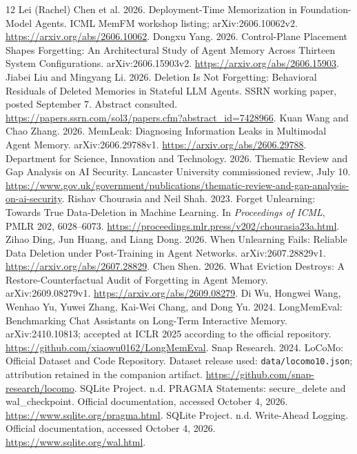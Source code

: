 ﻿\documentclass[sigconf,nonacm]{acmart}
\begin{document}
\begin{thebibliography}{12}
 Lei (Rachel) Chen et al. 2026. Deployment-Time Memorization in Foundation-Model Agents. ICML MemFM workshop listing; arXiv:2606.10062v2. \url{https://arxiv.org/abs/2606.10062}.
 Dongxu Yang. 2026. Control-Plane Placement Shapes Forgetting: An Architectural Study of Agent Memory Across Thirteen System Configurations. arXiv:2606.15903v2. \url{https://arxiv.org/abs/2606.15903}.
 Jiabei Liu and Mingyang Li. 2026. Deletion Is Not Forgetting: Behavioral Residuals of Deleted Memories in Stateful LLM Agents. SSRN working paper, posted September 7. Abstract consulted. \url{https://papers.ssrn.com/sol3/papers.cfm?abstract_id=7428966}.
 Kuan Wang and Chao Zhang. 2026. MemLeak: Diagnosing Information Leaks in Multimodal Agent Memory. arXiv:2606.29788v1. \url{https://arxiv.org/abs/2606.29788}.
 Department for Science, Innovation and Technology. 2026. Thematic Review and Gap Analysis on AI Security. Lancaster University commissioned review, July 10. \url{https://www.gov.uk/government/publications/thematic-review-and-gap-analysis-on-ai-security}.
 Rishav Chourasia and Neil Shah. 2023. Forget Unlearning: Towards True Data-Deletion in Machine Learning. In \emph{Proceedings of ICML}, PMLR 202, 6028--6073. \url{https://proceedings.mlr.press/v202/chourasia23a.html}.
 Zihao Ding, Jun Huang, and Liang Dong. 2026. When Unlearning Fails: Reliable Data Deletion under Post-Training in Agent Networks. arXiv:2607.28829v1. \url{https://arxiv.org/abs/2607.28829}.
 Chen Shen. 2026. What Eviction Destroys: A Restore-Counterfactual Audit of Forgetting in Agent Memory. arXiv:2609.08279v1. \url{https://arxiv.org/abs/2609.08279}.
 Di Wu, Hongwei Wang, Wenhao Yu, Yuwei Zhang, Kai-Wei Chang, and Dong Yu. 2024. LongMemEval: Benchmarking Chat Assistants on Long-Term Interactive Memory. arXiv:2410.10813; accepted at ICLR 2025 according to the official repository. \url{https://github.com/xiaowu0162/LongMemEval}.
 Snap Research. 2024. LoCoMo: Official Dataset and Code Repository. Dataset release used: \texttt{data/locomo10.json}; attribution retained in the companion artifact. \url{https://github.com/snap-research/locomo}.
 SQLite Project. n.d. PRAGMA Statements: secure\_delete and wal\_checkpoint. Official documentation, accessed October 4, 2026. \url{https://www.sqlite.org/pragma.html}.
 SQLite Project. n.d. Write-Ahead Logging. Official documentation, accessed October 4, 2026. \url{https://www.sqlite.org/wal.html}.
\end{thebibliography}
\end{document}
